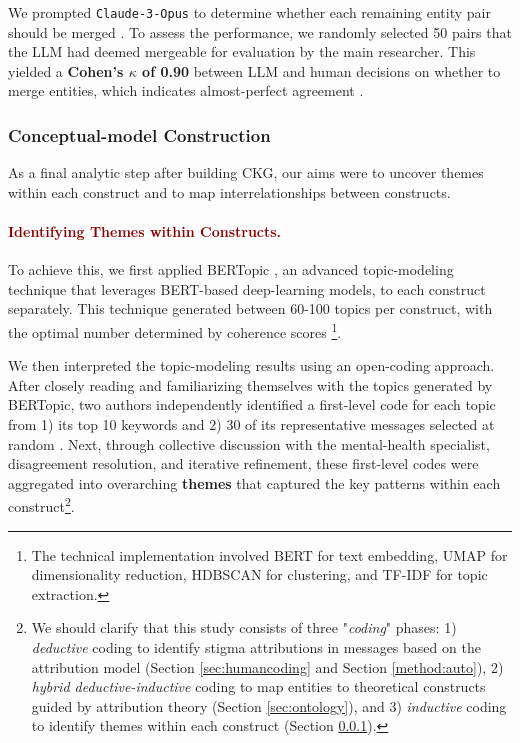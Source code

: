 We prompted \texttt{Claude-3-Opus} to determine whether each remaining entity pair should be merged \cite{entity_matching_2023}. 
To assess the performance, we randomly selected 50 pairs that the LLM had deemed mergeable for evaluation by the main researcher. 
This yielded a \textbf{Cohen's $\kappa$ of 0.90} between LLM and human decisions on whether to merge entities, which indicates almost-perfect agreement \cite{cohens_kappa_mchugh_2012}.




\subsubsection{Conceptual-model Construction}
\label{sec:conceptual}


As a final analytic step after building CKG, our aims were to uncover themes within each construct and to map interrelationships between constructs.


\paragraph{\textcolor{darkred}{\textbf{Identifying Themes within Constructs.}}}
To achieve this, we first applied BERTopic \cite{bertopic_grootendorst_2022}, an advanced topic-modeling technique that leverages BERT-based deep-learning models, to each construct separately. 
This technique generated between 60-100 topics per construct, with the optimal number determined by coherence scores \cite{topic_modeling_practice_liu_2024}\footnote{The technical implementation involved BERT for text embedding, UMAP for dimensionality reduction, HDBSCAN for clustering, and TF-IDF for topic extraction.}.


We then interpreted the topic-modeling results using an open-coding approach. 
After closely reading and familiarizing themselves with the topics generated by BERTopic, two authors independently identified a first-level code for each topic from 1) its top 10 keywords and 2) 30 of its representative messages selected at random \cite{topic_modeling_practice_liu_2024}.
Next, through collective discussion with the mental-health specialist, disagreement resolution, and iterative refinement, these first-level codes were aggregated into overarching \textbf{themes} that captured the key patterns within each construct\footnote{We should clarify that this study consists of three "\textit{coding}" phases: 1) \textit{deductive} coding to identify stigma attributions in messages based on the attribution model \cite{attribution_model_corrigan_2003} (Section \ref{sec:humancoding} and Section \ref{method:auto}), 2) \textit{hybrid deductive-inductive} coding to map entities to theoretical constructs guided by attribution theory \cite{attribution_theory_corrigan_2000} (Section \ref{sec:ontology}), and 3) \textit{inductive} coding to identify themes within each construct (Section \ref{sec:conceptual}).}.





